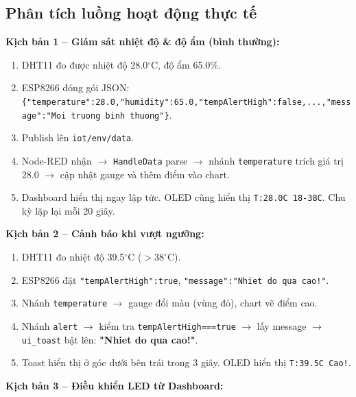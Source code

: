 \documentclass[13pt,a4paper]{article}
\newcommand{\code}[1]{\texttt{#1}}
\begin{document}
\subsection{Phân tích luồng hoạt động thực tế}
\label{sec:phantich}

\textbf{Kịch bản 1 -- Giám sát nhiệt độ \& độ ẩm (bình thường):}

\begin{enumerate}[label=\arabic*., leftmargin=1.5cm]
    \item DHT11 đo được nhiệt độ 28.0$^\circ$C, độ ẩm 65.0\%.
    \item ESP8266 đóng gói JSON: \code{\{"temperature":28.0,"humidity":65.0,"tempAlertHigh":false,...,"message":"Moi truong binh thuong"\}}.
    \item Publish lên \code{iot/env/data}.
    \item Node-RED nhận $\rightarrow$ \code{HandleData} parse $\rightarrow$ nhánh \code{temperature} trích giá trị 28.0 $\rightarrow$ cập nhật gauge và thêm điểm vào chart.
    \item Dashboard hiển thị ngay lập tức. OLED cũng hiển thị \code{T:28.0C 18-38C}. Chu kỳ lặp lại mỗi 20 giây.
\end{enumerate}

\textbf{Kịch bản 2 -- Cảnh báo khi vượt ngưỡng:}

\begin{enumerate}[label=\arabic*., leftmargin=1.5cm]
    \item DHT11 đo nhiệt độ 39.5$^\circ$C ($> 38^\circ$C).
    \item ESP8266 đặt \code{"tempAlertHigh":true}, \code{"message":"Nhiet do qua cao!"}.
    \item Nhánh \code{temperature} $\rightarrow$ gauge đổi màu (vùng đỏ), chart vẽ điểm cao.
    \item Nhánh \code{alert} $\rightarrow$ kiểm tra \code{tempAlertHigh===true} $\rightarrow$ lấy message $\rightarrow$ \code{ui\_toast} bật lên: \textbf{"Nhiet do qua cao!"}.
    \item Toast hiển thị ở góc dưới bên trái trong 3 giây. OLED hiển thị \code{T:39.5C Cao!}.
\end{enumerate}

\textbf{Kịch bản 3 -- Điều khiển LED từ Dashboard:}
\end{document}

